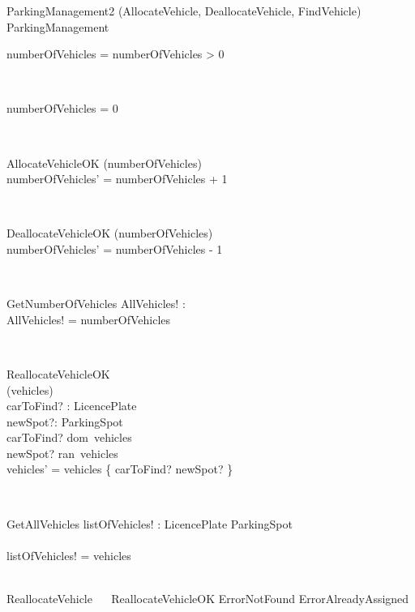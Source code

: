 \documentclass[12pt]{article}
\begin{document}
\begin{spacing}{1.5}
\begin{class}{ParkingManagement2}
\upharpoonright (AllocateVehicle, DeallocateVehicle, FindVehicle)\\
ParkingManagement\\
\begin{state}
numberOfVehicles = 
\where
numberOfVehicles > 0
\end{state} \\
\begin{init}
numberOfVehicles = 0 \\
\end{init} \\
\begin{op}{AllocateVehicleOK}
\Delta (numberOfVehicles)\\
\ST
numberOfVehicles' = numberOfVehicles + 1\\
\end{op}\\
\begin{op}{DeallocateVehicleOK}
\Delta (numberOfVehicles)\\
\ST
numberOfVehicles' = numberOfVehicles - 1\\
\end{op}\\
\begin{op}{GetNumberOfVehicles }
AllVehicles! : \\
\ST
AllVehicles! = numberOfVehicles\\
\end{op}\\
\begin{op}{ReallocateVehicleOK}
\\
\Delta (vehicles)\\
carToFind? : LicencePlate\\
newSpot?: ParkingSpot\\
\ST
carToFind? \in dom~vehicles\\
newSpot? \notin ran~vehicles\\
vehicles' = vehicles \oplus \{ carToFind? \rightarrowtail newSpot? \}
\\
\end{op}\\
\begin{op}{GetAllVehicles}
listOfVehicles! : LicencePlate  \rightarrowtail ParkingSpot\\\\
\ST
listOfVehicles! = vehicles\\
\end{op}\\
ReallocateVehicle \ \mathrel{\widehat{=}} \ ReallocateVehicleOK \vee ErrorNotFound \vee ErrorAlreadyAssigned\\
\end{class}

\end{spacing}
\end{document}
